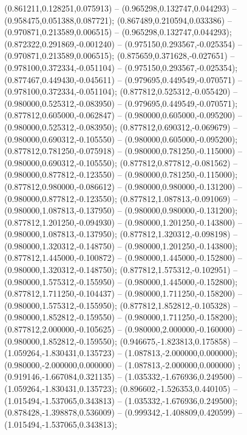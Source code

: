  (0.861211,0.128251,0.075913) -- (0.965298,0.132747,0.044293) -- (0.958475,0.051388,0.087721);
 (0.867489,0.210594,0.033386) -- (0.970871,0.213589,0.006515) -- (0.965298,0.132747,0.044293);
 (0.872322,0.291869,-0.001240) -- (0.975150,0.293567,-0.025354) -- (0.970871,0.213589,0.006515);
 (0.875659,0.371628,-0.027651) -- (0.978100,0.372334,-0.051104) -- (0.975150,0.293567,-0.025354);
 (0.877467,0.449430,-0.045611) -- (0.979695,0.449549,-0.070571) -- (0.978100,0.372334,-0.051104);
 (0.877812,0.525312,-0.055420) -- (0.980000,0.525312,-0.083950) -- (0.979695,0.449549,-0.070571);
 (0.877812,0.605000,-0.062847) -- (0.980000,0.605000,-0.095200) -- (0.980000,0.525312,-0.083950);
 (0.877812,0.690312,-0.069679) -- (0.980000,0.690312,-0.105550) -- (0.980000,0.605000,-0.095200);
 (0.877812,0.781250,-0.075918) -- (0.980000,0.781250,-0.115000) -- (0.980000,0.690312,-0.105550);
 (0.877812,0.877812,-0.081562) -- (0.980000,0.877812,-0.123550) -- (0.980000,0.781250,-0.115000);
 (0.877812,0.980000,-0.086612) -- (0.980000,0.980000,-0.131200) -- (0.980000,0.877812,-0.123550);
 (0.877812,1.087813,-0.091069) -- (0.980000,1.087813,-0.137950) -- (0.980000,0.980000,-0.131200);
 (0.877812,1.201250,-0.094930) -- (0.980000,1.201250,-0.143800) -- (0.980000,1.087813,-0.137950);
 (0.877812,1.320312,-0.098198) -- (0.980000,1.320312,-0.148750) -- (0.980000,1.201250,-0.143800);
 (0.877812,1.445000,-0.100872) -- (0.980000,1.445000,-0.152800) -- (0.980000,1.320312,-0.148750);
 (0.877812,1.575312,-0.102951) -- (0.980000,1.575312,-0.155950) -- (0.980000,1.445000,-0.152800);
 (0.877812,1.711250,-0.104437) -- (0.980000,1.711250,-0.158200) -- (0.980000,1.575312,-0.155950);
 (0.877812,1.852812,-0.105328) -- (0.980000,1.852812,-0.159550) -- (0.980000,1.711250,-0.158200);
 (0.877812,2.000000,-0.105625) -- (0.980000,2.000000,-0.160000) -- (0.980000,1.852812,-0.159550);
 (0.946675,-1.823813,0.175858) -- (1.059264,-1.830431,0.135723) -- (1.087813,-2.000000,0.000000);
 (0.980000,-2.000000,0.000000) -- (1.087813,-2.000000,0.000000) ;
 (0.919146,-1.667084,0.321135) -- (1.035332,-1.676936,0.249500) -- (1.059264,-1.830431,0.135723);
 (0.896602,-1.526353,0.440105) -- (1.015494,-1.537065,0.343813) -- (1.035332,-1.676936,0.249500);
 (0.878428,-1.398878,0.536009) -- (0.999342,-1.408809,0.420599) -- (1.015494,-1.537065,0.343813);
